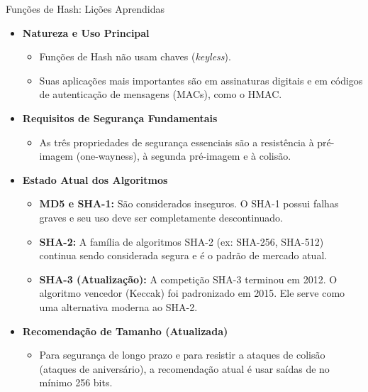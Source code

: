 \documentclass{beamer}
\begin{document}
\begin{frame}{Funções de Hash: Lições Aprendidas}

    \begin{itemize}
        \small
        \item \textbf{Natureza e Uso Principal}
        \small
        \begin{itemize}
            \item Funções de Hash não usam chaves (\textit{keyless}).
            \item Suas aplicações mais importantes são em assinaturas digitais e em códigos de autenticação de mensagens (MACs), como o HMAC.
        \end{itemize}
        
        \item \textbf{Requisitos de Segurança Fundamentais}
        \small
        \begin{itemize}
            \item As três propriedades de segurança essenciais são a resistência à pré-imagem (one-wayness), à segunda pré-imagem e à colisão.
        \end{itemize}

        \item \textbf{Estado Atual dos Algoritmos}
        \small
        \begin{itemize}
            \item \textbf{MD5 e SHA-1:} São considerados \alert{inseguros}. O SHA-1 possui falhas graves e seu uso deve ser completamente descontinuado.
            \item \textbf{SHA-2:} A família de algoritmos SHA-2 (ex: SHA-256, SHA-512) continua sendo considerada segura e é o padrão de mercado atual.
            \item \textbf{SHA-3 (Atualização):} A competição SHA-3 \alert{terminou em 2012}. O algoritmo vencedor (Keccak) foi padronizado em 2015. Ele serve como uma alternativa moderna ao SHA-2.
        \end{itemize}

        
        \item \textbf{Recomendação de Tamanho (Atualizada)}
        \small
        \begin{itemize}
            \item Para segurança de longo prazo e para resistir a ataques de colisão (ataques de aniversário), a recomendação atual é usar saídas de no mínimo \alert{256 bits}.
        \end{itemize}
    \end{itemize}
\end{frame}
\end{document}
